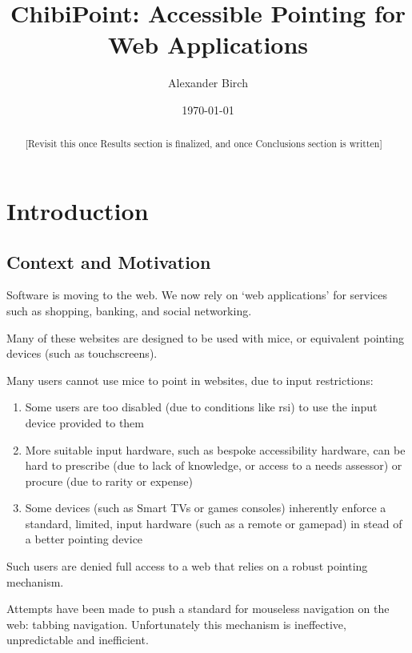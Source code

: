 \documentclass[a4paper, 12pt]{report}
\title{ChibiPoint: Accessible Pointing for Web Applications}
\author{Alexander Birch}
\date{\today}
\begin{document}

\maketitle
\begin{abstract}
[Revisit this once Results section is finalized, and once Conclusions section is written]
\end{abstract}

\tableofcontents


\chapter{Introduction}

\section{Context and Motivation}
Software is moving to the web. We now rely on `web applications' for services such as shopping, banking, and social networking.

Many of these websites are designed to be used with mice, or equivalent pointing devices (such as touchscreens).

Many users cannot use mice to point in websites, due to input restrictions:
\begin{enumerate}
\item Some users are too disabled (due to conditions like \gls{rsi}) to use the input device provided to them
\item More suitable input hardware, such as bespoke accessibility hardware, can be hard to prescribe (due to lack of knowledge, or access to a needs assessor) or procure (due to rarity or expense)
\item Some devices (such as Smart TVs or games consoles) inherently enforce a standard, limited, input hardware (such as a remote or gamepad) in stead of a better pointing device
\end{enumerate}

Such users are denied full access to a web that relies on a robust pointing mechanism.

Attempts have been made to push a standard for mouseless navigation on the web: tabbing navigation. Unfortunately this mechanism is ineffective, unpredictable and inefficient.
\end{document}
